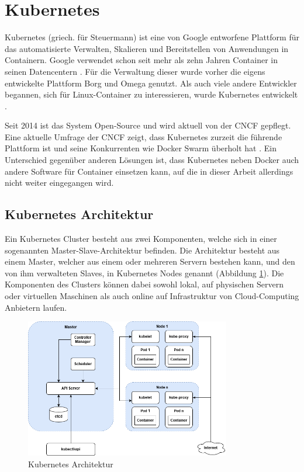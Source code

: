 \section{Kubernetes}
\label{sec:kube}
Kubernetes (griech. für Steuermann) ist eine von Google entworfene Plattform für das automatisierte Verwalten, Skalieren und Bereitstellen von Anwendungen in Containern. Google verwendet schon seit mehr als zehn Jahren Container in seinen Datencentern \cite{Burns2016BorgKubernetes}. Für die Verwaltung dieser wurde vorher die eigens entwickelte Plattform Borg und Omega genutzt. Als auch viele andere Entwickler begannen, sich für Linux-Container zu interessieren, wurde Kubernetes entwickelt \cite{Burns2016BorgKubernetes}. \medskip

Seit 2014 ist das System Open-Source und wird aktuell von der \ac{CNCF} gepflegt. Eine aktuelle Umfrage der \ac{CNCF} zeigt, dass Kubernetes zurzeit die führende Plattform ist und seine Konkurrenten wie Docker Swarm überholt hat \cite{kube:survey}. Ein Unterschied gegenüber anderen Lösungen ist, dass Kubernetes neben Docker auch andere Software für Container einsetzen kann, auf die in dieser Arbeit allerdings nicht weiter eingegangen wird.

\subsection{Kubernetes Architektur}
Ein Kubernetes Cluster besteht aus zwei Komponenten, welche sich in einer sogenannten Master-Slave-Architektur befinden. Die Architektur besteht aus einem Master, welcher aus einem oder mehreren Servern bestehen kann, und den von ihm verwalteten Slaves, in Kubernetes Nodes genannt (Abbildung \ref{fig:kubearchitektur}). Die Komponenten des Clusters können dabei sowohl lokal, auf physischen Servern oder virtuellen Maschinen als auch online auf Infrastruktur von Cloud-Computing Anbietern laufen.
\begin{figure}[htb]
\centering
\includegraphics[width=0.8\textwidth,angle=0]{gfx/Kubernetes_Architektur}
\caption[Kubernetes Architektur]{Kubernetes Architektur}
\label{fig:kubearchitektur}
\end{figure}

